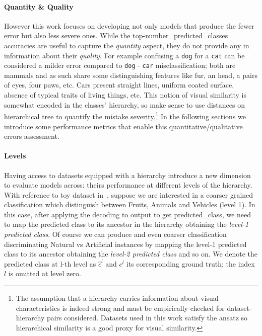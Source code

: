 \paragraph {Quantity \& Quality}
\label{par:metrics-quantity-quality}
However this work focuses on developing not only models that produce the fewer
error but also less severe ones. While the top-\gls{number_predicted_classes}
accuracies are useful to capture the \emph{quantity} aspect, they do not provide
any in information about their \emph{quality}. For example confusing a
\texttt{dog} for a \texttt{cat} can be considered a milder error compared to
\texttt{dog} - \texttt{car} misclassification; both are mammals and as such
share some distinguishing features like fur, an head, a pairs of eyes, four
paws, etc. Cars present straight lines, uniform coated surface, absence of
typical traits of living things, etc. This notion of visual similarity is
somewhat encoded in the classes' hierarchy, so make sense to use distances on
hierarchical tree to quantify the mistake severity.\footnote{The assumption that
  a hierarchy carries information about visual characteristics is indeed strong
  and must be empirically checked for dataset-hierarchy pairs considered.
Datasets used in this work satisfy the ansatz so hierarchical similarity is a
good proxy for visual similarity.} In the following sections we introduce some
performance metrics that enable this quantitative/qualitative errors assessment.

\paragraph {Levels}
\label{par:metrics-levels}
Having access to datasets equipped with a hierarchy introduce a new dimension to
evaluate models across: theirs performance at different levels of the hierarchy.
With reference to toy dataset in~, suppose we are
interested in a coarser grained classification which distinguish between Fruits,
Animals and Vehicles (level 1). In this case, after applying the decoding to
\gls{output} to get \gls{predicted_class}, we need to map the predicted class to
its ancestor in the hierarchy obtaining the \emph{level-1 predicted class}. Of
course we can produce and even coarser classification discriminating Natural vs
Artificial instances by mapping the level-1 predicted class to its ancestor
obtaining the \emph{level-2 predicted class} and so on. We denote the predicted
class at l-th level as $\hat{c}^l$ and $c^l$ its corresponding ground truth; the
index $l$ is omitted at level zero.

